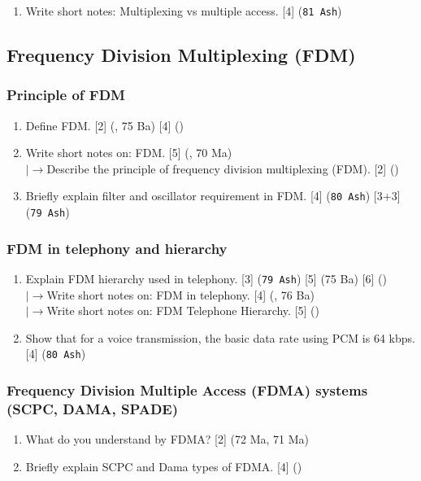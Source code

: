 \documentclass[12pt]{article}
\newcommand{\lb}{\\$\left|\rightarrow\right.$}
\begin{document}
  \begin{enumerate}
    \item Write short notes: Multiplexing vs multiple access. \hfill [4] (\texttt{81 Ash})
  \end{enumerate}

  \subsection{Frequency Division Multiplexing (FDM)}
    \subsubsection{Principle of FDM}
      \begin{enumerate}
        \item Define FDM. \hfill [2] (, 75 Ba) [4] ()

        \item Write short notes on: FDM. \hfill [5] (, 70 Ma)
          \lb Describe the principle of frequency division multiplexing (FDM). \hfill [2] ()

        \item Briefly explain filter and oscillator requirement in FDM. \hfill [4] (\texttt{80 Ash}) [3+3] (\texttt{79 Ash})
      \end{enumerate}

    \subsubsection{FDM in telephony and hierarchy}
      \begin{enumerate}
        \item Explain FDM hierarchy used in telephony. \hfill [3] (\texttt{79 Ash}) [5] (75 Ba) [6] ()
          \lb Write short notes on: FDM in telephony. \hfill [4] (, 76 Ba)
          \lb Write short notes on: FDM Telephone Hierarchy. \hfill [5] ()

        \item Show that for a voice transmission, the basic data rate using PCM is 64 kbps. \hfill [4] (\texttt{80 Ash})
      \end{enumerate}

    \subsubsection{Frequency Division Multiple Access (FDMA) systems (SCPC, DAMA, SPADE)}
      \begin{enumerate}
        \item What do you understand by FDMA? \hfill [2] (72 Ma, 71 Ma)

        \item Briefly explain SCPC and Dama types of FDMA. \hfill [4] ()
      \end{enumerate}
\end{document}
